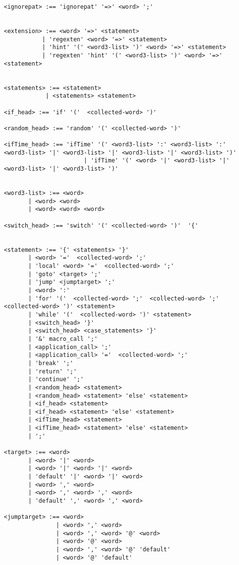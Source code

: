 {\begin{astlisting}
\begin{verbatim}
<ignorepat> :== 'ignorepat' '=>' <word> ';'


<extension> :== <word> '=>' <statement>
           | 'regexten' <word> '=>' <statement>
           | 'hint' '(' <word3-list> ')' <word> '=>' <statement>
           | 'regexten' 'hint' '(' <word3-list> ')' <word> '=>' <statement>


<statements> :== <statement>
            | <statements> <statement>

<if_head> :== 'if' '('  <collected-word> ')'

<random_head> :== 'random' '(' <collected-word> ')'

<ifTime_head> :== 'ifTime' '(' <word3-list> ':' <word3-list> ':' <word3-list> '|' <word3-list> '|' <word3-list> '|' <word3-list> ')'
                       | 'ifTime' '(' <word> '|' <word3-list> '|' <word3-list> '|' <word3-list> ')'


<word3-list> :== <word>
       | <word> <word>
       | <word> <word> <word>

<switch_head> :== 'switch' '(' <collected-word> ')'  '{'


<statement> :== '{' <statements> '}'
       | <word> '='  <collected-word> ';'
       | 'local' <word> '='  <collected-word> ';'
       | 'goto' <target> ';'
       | 'jump' <jumptarget> ';'
       | <word> ':'
       | 'for' '('  <collected-word> ';'  <collected-word> ';' <collected-word> ')' <statement>
       | 'while' '('  <collected-word> ')' <statement>
       | <switch_head> '}'
       | <switch_head> <case_statements> '}'
       | '&' macro_call ';'
       | <application_call> ';'
       | <application_call> '='  <collected-word> ';'
       | 'break' ';'
       | 'return' ';'
       | 'continue' ';'
       | <random_head> <statement>
       | <random_head> <statement> 'else' <statement>
       | <if_head> <statement>
       | <if_head> <statement> 'else' <statement>
       | <ifTime_head> <statement>
       | <ifTime_head> <statement> 'else' <statement>
       | ';'

<target> :== <word>
       | <word> '|' <word>
       | <word> '|' <word> '|' <word>
       | 'default' '|' <word> '|' <word>
       | <word> ',' <word>
       | <word> ',' <word> ',' <word>
       | 'default' ',' <word> ',' <word>

<jumptarget> :== <word>
               | <word> ',' <word>
               | <word> ',' <word> '@' <word>
               | <word> '@' <word>
               | <word> ',' <word> '@' 'default'
               | <word> '@' 'default'


\end{verbatim}
\end{astlisting}}
